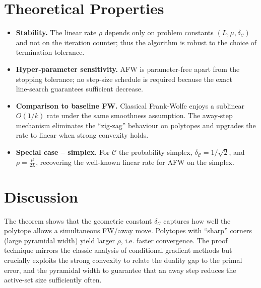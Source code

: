 \documentclass{article}
\newcommand{\C}{\mathcal{C}}
\begin{document}
\section*{Theoretical Properties}
\begin{itemize}[leftmargin=*]
\item \textbf{Stability.} The linear rate $\rho$ depends only on problem constants $(L,\mu,\delta_{\C})$ and not on the iteration counter; thus the algorithm is robust to the choice of termination tolerance.
\item \textbf{Hyper‑parameter sensitivity.} AFW is parameter‑free apart from the stopping tolerance; no step‑size schedule is required because the exact line‑search guarantees sufficient decrease.
\item \textbf{Comparison to baseline FW.} Classical Frank‑Wolfe enjoys a sublinear $O(1/k)$ rate under the same smoothness assumption. The away‑step mechanism eliminates the ``zig‑zag'' behaviour on polytopes and upgrades the rate to linear when strong convexity holds.
\item \textbf{Special case – simplex.} For $\C$ the probability simplex, $\delta_{\C}=1/\sqrt{2}$, and $\rho=\frac{\mu}{2L}$, recovering the well‑known linear rate for AFW on the simplex.
\end{itemize}

\section*{Discussion}
The theorem shows that the geometric constant $\delta_{\C}$ captures how well the polytope allows a simultaneous FW/away move. Polytopes with ``sharp'' corners (large pyramidal width) yield larger $\rho$, i.e. faster convergence. The proof technique mirrors the classic analysis of conditional gradient methods but crucially exploits the strong convexity to relate the duality gap to the primal error, and the pyramidal width to guarantee that an away step reduces the active‑set size sufficiently often.

\newpage
\end{document}
